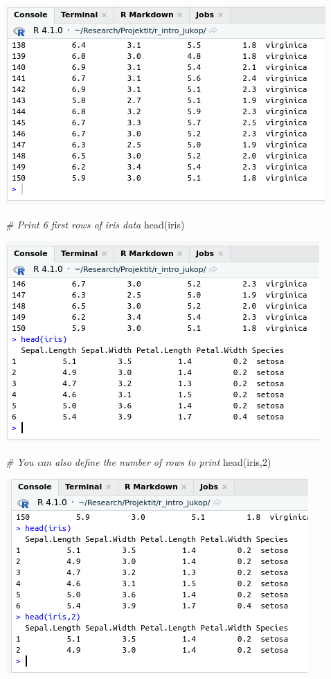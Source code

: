 \documentclass[
]{book}
\newenvironment{Shaded}{\begin{snugshade}}{\end{snugshade}}
\newcommand{\CommentTok}[1]{\textcolor[rgb]{0.56,0.35,0.01}{\textit{#1}}}
\newcommand{\DecValTok}[1]{\textcolor[rgb]{0.00,0.00,0.81}{#1}}
\newcommand{\FunctionTok}[1]{\textcolor[rgb]{0.00,0.00,0.00}{#1}}
\newcommand{\NormalTok}[1]{#1}
\begin{document}
\includegraphics{files/02-data_types/iris_print_data.png}

\begin{Shaded}
\begin{Highlighting}[]
\CommentTok{\# Print 6 first rows of iris data}
\FunctionTok{head}\NormalTok{(iris)}
\end{Highlighting}
\end{Shaded}

\includegraphics{files/02-data_types/iris_print_head_data.png}

\begin{Shaded}
\begin{Highlighting}[]
\CommentTok{\# You can also define the number of rows to print}
\FunctionTok{head}\NormalTok{(iris,}\DecValTok{2}\NormalTok{)}
\end{Highlighting}
\end{Shaded}

\includegraphics{files/02-data_types/iris_print_head2_data.png}
\end{document}
